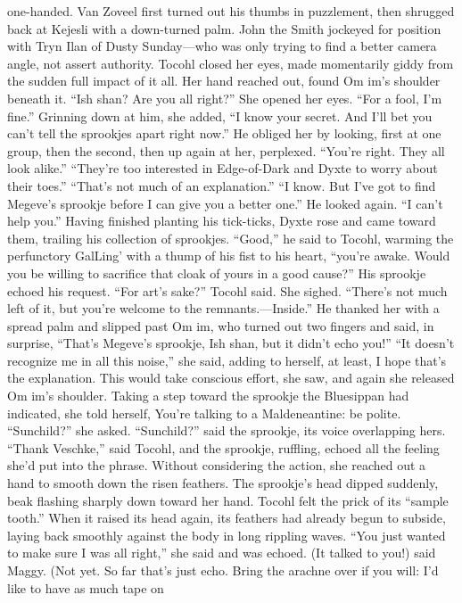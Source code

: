 \documentclass[9pt]{article}
\begin{document}
one-handed. Van Zoveel first turned out his thumbs in puzzlement, then shrugged back at Kejesli with a
down-turned palm. John the Smith jockeyed for position with Tryn Ilan of Dusty Sunday—who was only
trying to find a better camera angle, not assert authority.
Tocohl closed her eyes, made momentarily giddy from the sudden full impact of it all. Her hand
reached out, found Om im’s shoulder beneath it.
“Ish shan? Are you all right?”
She opened her eyes. “For a fool, I’m fine.” Grinning down at him, she added, “I know your secret.
And I’ll bet you can’t tell the sprookjes apart right now.”
He obliged her by looking, first at one group, then the second, then up again at her, perplexed.
“You’re right. They all look alike.”
“They’re too interested in Edge-of-Dark and Dyxte to worry about their toes.”
“That’s not much of an explanation.”
“I know. But I’ve got to find Megeve’s sprookje before I can give you a better one.”
He looked again. “I can’t help you.”
Having finished planting his tick-ticks, Dyxte rose and came toward them, trailing his collection of
sprookjes. “Good,” he said to Tocohl, warming the perfunctory GalLing’ with a thump of his fist to his
heart, “you’re awake. Would you be willing to sacrifice that cloak of yours in a good cause?” His
sprookje echoed his request.
“For art’s sake?” Tocohl said. She sighed. “There’s not much left of it, but you’re welcome to the
remnants.—Inside.”
He thanked her with a spread palm and slipped past Om im, who turned out two fingers and said, in
surprise, “That’s Megeve’s sprookje, Ish shan, but it didn’t echo you!”
“It doesn’t recognize me in all this noise,” she said, adding to herself, at least, I hope that’s the
explanation. This would take conscious effort, she saw, and again she released Om im’s shoulder. Taking
a step toward the sprookje the Bluesippan had indicated, she told herself, You’re talking to a
Maldeneantine: be polite. “Sunchild?” she asked.
“Sunchild?” said the sprookje, its voice overlapping hers.
“Thank Veschke,” said Tocohl, and the sprookje, ruffling, echoed all the feeling she’d put into the
phrase. Without considering the action, she reached out a hand to smooth down the risen feathers.
The sprookje’s head dipped suddenly, beak flashing sharply down toward her hand. Tocohl felt the
prick of its “sample tooth.” When it raised its head again, its feathers had already begun to subside, laying
back smoothly against the body in long rippling waves. “You just wanted to make sure I was all right,”
she said and was echoed.
(It talked to you!) said Maggy.
(Not yet. So far that’s just echo. Bring the arachne over if you will: I’d like to have as much tape on
\end{document}

